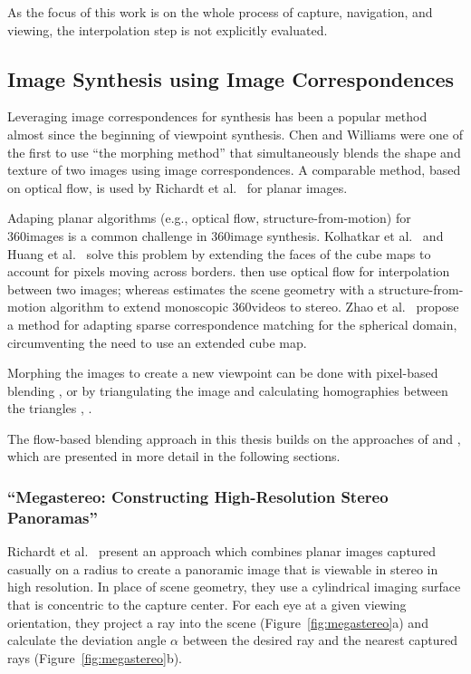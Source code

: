 As the focus of this work is on the whole process of capture, navigation, and viewing, the interpolation step is not explicitly evaluated.

\subsection{Image Synthesis using Image Correspondences}
Leveraging image correspondences for synthesis has been a popular method almost since the beginning of viewpoint synthesis. Chen and Williams \cite{apple} were one of the first to use ``the morphing method'' that simultaneously blends the shape and texture of two images using image correspondences. A comparable method, based on optical flow, is used by Richardt et al.\ \cite{megastereo} for planar images.

Adaping planar algorithms (e.g., optical flow, structure-from-motion) for 360\degree images is a common challenge in 360\degree image synthesis. Kolhatkar et al.\ \cite{360flowblending} and Huang et al.\ \cite{6dof} solve this problem by extending the faces of the cube maps to account for pixels moving across borders. \cite{360flowblending} then use optical flow for interpolation between two images; whereas \cite{6dof} estimates the scene geometry with a structure-from-motion algorithm to extend monoscopic 360\degree videos to stereo. Zhao et al.\ \cite{cube2video} propose a method for adapting sparse correspondence matching for the spherical domain, circumventing the need to use an extended cube map.

Morphing the images to create a new viewpoint can be done with pixel-based blending \cite{megastereo}, \cite{360flowblending} or by triangulating the image and calculating homographies between the triangles \cite{6dof}, \cite{cube2video}.



The flow-based blending approach in this thesis builds on the approaches of \cite{megastereo} and \cite{360flowblending}, which are presented in more detail in the following sections.

\subsubsection{``Megastereo: Constructing High-Resolution Stereo Panoramas'' \cite{megastereo} \label{subsec:megastereo}}
Richardt et al.\ \cite{megastereo} present an approach which combines planar images captured casually on a radius to create a panoramic image that is viewable in stereo in high resolution. In place of scene geometry, they use a cylindrical imaging surface that is concentric to the capture center. For each eye at a given viewing orientation, they project a ray into the scene (Figure~\ref{fig:megastereo}a) and calculate the deviation angle $\alpha$ between the desired ray and the nearest captured rays (Figure~\ref{fig:megastereo}b). 

